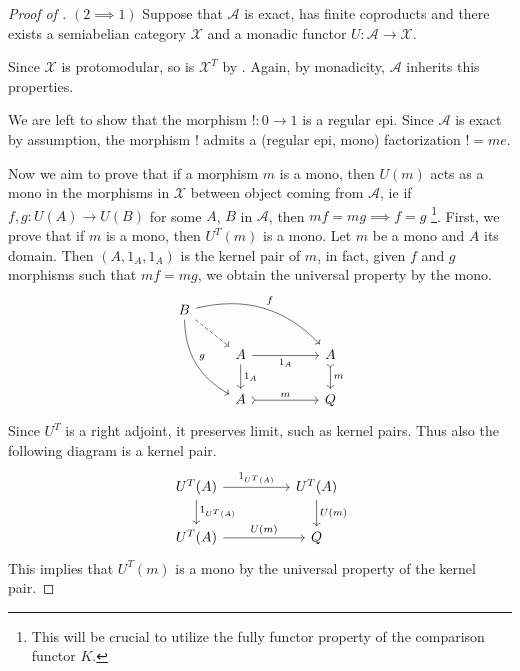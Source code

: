 \begin{subbox}{}
\begin{proof}[\textit{Proof of }]
    $(2 \implies 1)$ Suppose that $\mathcal{A}$ is exact, has finite coproducts and there exists a semiabelian category $\mathcal{X}$ and a monadic functor $U: \mathcal{A} \to \mathcal{X}$.

    Since $\mathcal{X}$ is protomodular, so is $\mathcal{X}^T$ by . Again, by monadicity, $\mathcal{A}$ inherits this properties.

    We are left to show that the morphism $!:0 \to 1$ is a regular epi. Since $\mathcal{A}$ is exact by assumption, the morphism $!$ admits a (regular epi, mono) factorization $! = me$.
    
    Now we aim to prove that if a morphism $m$ is a mono, then $U(m)$ acts as a mono in the morphisms in $\mathcal{X}$ between object coming from $\mathcal{A}$, ie if $f,g : U(A) \to U(B)$ for some $A$, $B$ in $\mathcal{A}$, then $mf=mg \implies f=g$ \footnote{This will be crucial to utilize the fully functor property of the comparison functor $K$.}. First, we prove that if $m$ is a mono, then $U^T(m)$ is a mono. Let $m$ be a mono and $A$ its domain. Then $(A, 1_A, 1_A)$ is the kernel pair of $m$, in fact, given $f$ and $g$ morphisms such that $mf=mg$, we obtain the universal property by the mono.
    \[
\begin{tikzcd}
B \arrow[rdd, "g", bend right] \arrow[rrrd, "f", bend left] \arrow[rd, dashed] &                                       &  &                        \\
                                                                               & A \arrow[d, "1_A"] \arrow[rr, "1_A"'] &  & A \arrow[d, "m", tail] \\
                                                                               & A \arrow[rr, "m", tail]               &  & Q                     
\end{tikzcd}
    \]
    Since $U^T$ is a right adjoint, it preserves limit, such as kernel pairs. Thus also the following diagram is a kernel pair.
    \[
\begin{tikzcd}
U^T(A) \arrow[d, "1_{U^T(A)}"] \arrow[rr, "1_{U^T(A)}"] &  & U^T(A) \arrow[d, "U(m)"] \\
U^T(A) \arrow[rr, "U(m)"]                               &  & Q                       
\end{tikzcd}
    \]
    This implies that $U^T(m)$ is a mono by the universal property of the kernel pair. 
    

\end{proof}
\end{subbox}
